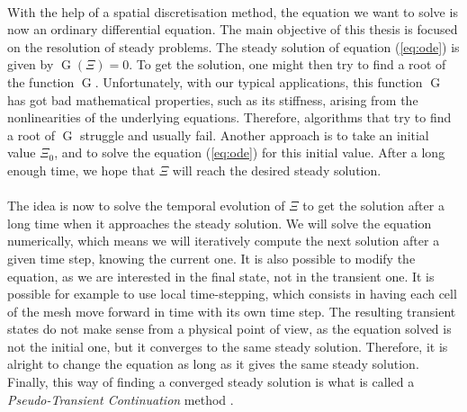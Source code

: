     \paragraph{}
    With the help of a spatial discretisation method, the equation we want to solve is now an ordinary differential equation.
    The main objective of this thesis is focused on the resolution of steady problems.
    The steady solution of equation (\ref{eq:ode}) is given by $\operatorname{G}\left(\Xi\right) = 0$.
    To get the solution, one might then try to find a root of the function $\operatorname{G}$.
    Unfortunately, with our typical applications, this function $\operatorname{G}$ has got bad mathematical properties, such as its stiffness, arising from the nonlinearities of the underlying equations.
    Therefore, algorithms that try to find a root of $\operatorname{G}$ struggle and usually fail.
    Another approach is to take an initial value $\Xi_0$, and to solve the equation (\ref{eq:ode}) for this initial value.
    After a long enough time, we hope that $\Xi$ will reach the desired steady solution.

    \paragraph{}
    The idea is now to solve the temporal evolution of $\Xi$ to get the solution after a long time when it approaches the steady solution.
    We will solve the equation numerically, which means we will iteratively compute the next solution after a given time step, knowing the current one.
    It is also possible to modify the equation, as we are interested in the final state, not in the transient one.
    It is possible for example to use local time-stepping, which consists in having each cell of the mesh move forward in time with its own time step.
    The resulting transient states do not make sense from a physical point of view, as the equation solved is not the initial one, but it converges to the same steady solution.
    Therefore, it is alright to change the equation as long as it gives the same steady solution.
    Finally, this way of finding a converged steady solution is what is called a \emph{Pseudo-Transient Continuation} method \cite{KelleyKeyes1996}.

